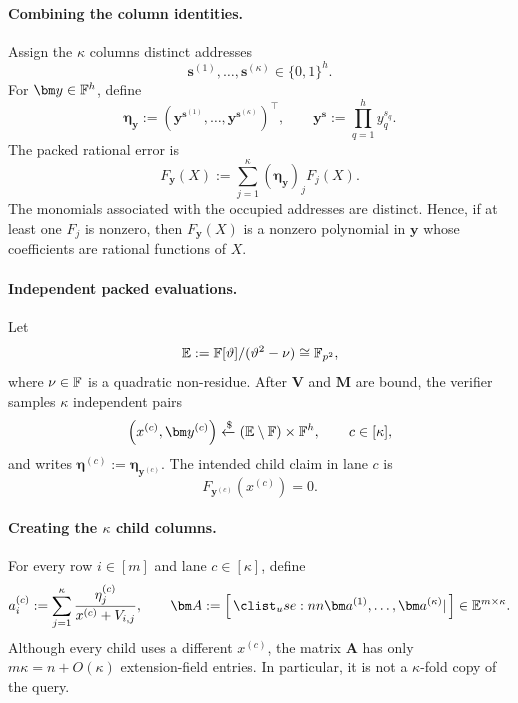 \documentclass[runningheads]{llncs}
\begin{document}
\paragraph{Combining the column identities.}
Assign the \(\kappa\) columns distinct addresses
\[
    \bm s^{(1)},\ldots,\bm s^{(\kappa)}
      \in\{0,1\}^{h}.
\]
For \(\bm y\in\Field^h\), define
\begin{equation}
    \bm\eta_{\bm y}
      :=
      \left(
        \bm y^{\bm s^{(1)}},\ldots,
        \bm y^{\bm s^{(\kappa)}}
      \right)^\top,
    \qquad
    \bm y^{\bm s}:=\prod_{q=1}^{h}y_q^{s_q}.
\label{eq:packed-logup-column-weights}
\end{equation}
The packed rational error is
\begin{equation}
    F_{\bm y}(X)
      :=\sum_{j=1}^{\kappa}
        (\bm\eta_{\bm y})_j F_j(X).
\label{eq:packed-logup-packed-rational-error}
\end{equation}
The monomials associated with the occupied addresses are distinct.
Hence, if at least one \(F_j\) is nonzero, then
\(F_{\bm y}(X)\) is a nonzero polynomial in \(\bm y\) whose
coefficients are rational functions of \(X\).

\paragraph{Independent packed evaluations.}
Let
\[
    \mathbb E:={\mathbb{F}}[\vartheta]/(\vartheta^2-\nu)
      \cong\mathbb F_{p^2},
\]
where \(\nu\in{\mathbb{F}}\) is a quadratic non-residue.  After \(\bm V\)
and \(\bm M\) are bound, the verifier samples \(\kappa\) independent
pairs
\begin{equation}
    \left(x^{(c)},\bm y^{(c)}\right)
      \ChooseRandom
      (\mathbb E\setminus\Field)\times\Field^h,
    \qquad c\in[\kappa],
\label{eq:packed-logup-initial-challenges}
\end{equation}
and writes \(\bm\eta^{(c)}:=\bm\eta_{\bm y^{(c)}}\).  The intended
child claim in lane \(c\) is
\[
    F_{\bm y^{(c)}}(x^{(c)})=0.
\]

\paragraph{Creating the \(\kappa\) child columns.}
For every row \(i\in[m]\) and lane \(c\in[\kappa]\), define
\begin{equation}
    a_i^{(c)}
      :=
      \sum_{j=1}^{\kappa}
        \frac{\eta_j^{(c)}}{x^{(c)}+V_{i,j}},
    \qquad
    \bm A
      :=\concat{\bm a^{(1)},\ldots,\bm a^{(\kappa)}}
      \in\mathbb E^{m\times\kappa}.
\label{eq:packed-logup-child-columns}
\end{equation}
Although every child uses a different \(x^{(c)}\), the matrix
\(\bm A\) has only \(m\kappa=n+O(\kappa)\) extension-field entries.
In particular, it is not a \(\kappa\)-fold copy of the query.
\end{document}
